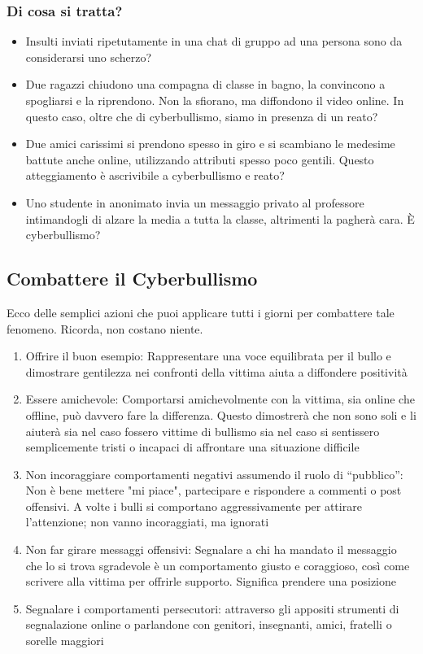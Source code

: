 \documentclass{article}
\begin{document}
\subsubsection{Di cosa si tratta?}
\begin{itemize}
	\item Insulti inviati ripetutamente in una chat di gruppo ad una persona sono da considerarsi uno scherzo?		
	\item Due ragazzi chiudono una compagna di classe in bagno, la convincono a spogliarsi e la riprendono. Non la sfiorano, ma diffondono il video online. In questo caso, oltre che di cyberbullismo, siamo in presenza di un reato?		
	\item Due amici carissimi si prendono spesso in giro e si scambiano le medesime battute anche online, utilizzando attributi spesso poco gentili. Questo atteggiamento è ascrivibile a cyberbullismo e reato?		
	\item Uno studente in anonimato invia un messaggio privato al professore intimandogli di alzare la media a tutta la classe, altrimenti la pagherà cara. È cyberbullismo?
\end{itemize}
\subsection{Combattere il Cyberbullismo}
Ecco delle semplici azioni che puoi applicare tutti i giorni per combattere tale fenomeno. Ricorda, non costano niente.
\begin{enumerate}
	\item Offrire il buon esempio: Rappresentare una voce equilibrata per il bullo e dimostrare gentilezza nei confronti della vittima aiuta a diffondere positività
	\item Essere amichevole: Comportarsi amichevolmente con la vittima, sia online che offline, può davvero fare la differenza. Questo dimostrerà che non sono soli e li aiuterà sia nel caso fossero vittime di bullismo sia nel caso si sentissero semplicemente tristi o incapaci di affrontare una situazione difficile
	\item Non incoraggiare comportamenti negativi assumendo il ruolo di “pubblico”: Non è bene mettere "mi piace", partecipare e rispondere a commenti o post offensivi. A volte i bulli si comportano aggressivamente per attirare l'attenzione; non vanno incoraggiati, ma ignorati
	\item Non far girare messaggi offensivi: Segnalare a chi ha mandato il messaggio che lo si trova sgradevole è un comportamento giusto e coraggioso, così come scrivere alla vittima per offrirle supporto. Significa prendere una posizione
	\item Segnalare i comportamenti persecutori: attraverso gli appositi strumenti di segnalazione online o parlandone con genitori, insegnanti, amici, fratelli o sorelle maggiori
\end{enumerate}
\end{document}
